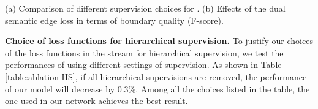 \documentclass[runningheads]{llncs}
\begin{document}
\begin{table}[h]
\caption{(a) Comparison of different supervision choices for \SemEdgeD. (b) Effect{s} of the dual semantic edge loss in terms of boundary quality (F-score).}
    \begin{subtable}[t]{0.6\textwidth}
        \caption{}
        \centering
       \label{table:ablation-HS}
    \end{subtable}
    \hfill
    \begin{subtable}[t]{0.38\textwidth}
        \caption{}
        \centering
        \label{table:ablation-DL}
     \end{subtable}
     \label{tab:temps}
\end{table}








\smallskip \noindent \textbf{Choice of loss functions for hierarchical supervision.}
To justify our choices of {the} loss functions in {the} {\SemEdgeD} stream for hierarchical supervision, we test the performances of {\SemEdgeD} using different settings of supervision. As shown in Table \ref{table:ablation-HS}, if all hierarchical supervisions are removed, the performance of our {\SemEdgeD} model will decrease by $0.3\%$. Among all the choices listed in the table, the one used in our network achieves the best result.
\end{document}
